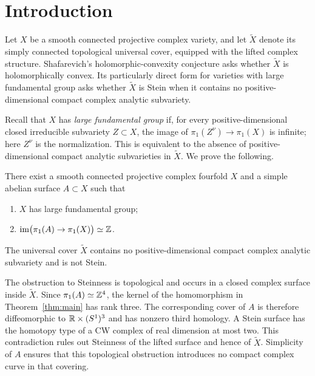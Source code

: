 \section{Introduction}\label{sec:introduction}

Let $X$ be a smooth connected projective complex variety, and let
$\widetilde X$ denote its simply connected topological universal cover,
equipped with the lifted complex structure.  Shafarevich's
holomorphic-convexity conjecture asks whether $\widetilde X$ is
holomorphically convex.  Its particularly direct form for varieties with
large fundamental group asks whether $\widetilde X$ is Stein when it
contains no positive-dimensional compact complex analytic subvariety.

Recall that $X$ has \emph{large fundamental group} if, for every
positive-dimensional closed irreducible subvariety $Z\subset X$, the image
of $\pi_1(Z^\nu)\to\pi_1(X)$ is infinite; here $Z^\nu$ is the
normalization.  This is equivalent to the absence of positive-dimensional
compact analytic subvarieties in $\widetilde X$.  We prove the following.

\begin{theorem}\label{thm:main}
There exist a smooth connected projective complex fourfold $X$ and a
simple abelian surface $A\subset X$ such that
\begin{enumerate}
\item $X$ has large fundamental group;
\item $\operatorname{im}\bigl(\pi_1(A)\to\pi_1(X)\bigr)\simeq\mathbb Z$.
\end{enumerate}
The universal cover $\widetilde X$ contains no positive-dimensional
compact complex analytic subvariety and is not Stein.
\end{theorem}

The obstruction to Steinness is topological and occurs in a closed
complex surface inside $\widetilde X$.  Since $\pi_1(A)\simeq\mathbb Z^4$,
the kernel of the homomorphism in Theorem~\ref{thm:main} has rank three.
The corresponding cover of $A$ is therefore diffeomorphic to
$\mathbb R\times(S^1)^3$ and has nonzero third homology.  A Stein surface has
the homotopy type of a CW complex of real dimension at most two.
This contradiction rules out Steinness of the lifted surface and hence
of $\widetilde X$.  Simplicity of $A$ ensures that this topological
obstruction introduces no compact complex curve in that covering.

